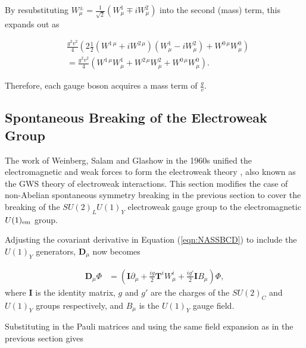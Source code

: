 \documentclass{article}
\begin{document}
By resubstituting $W^{\pm}_\mu = \frac{1}{\sqrt{2}}(W^{1}_\mu \mp iW^{2}_\mu)$ into the second (mass) term, this expands out as

\begin{equation}
\begin{split}
& \frac{g^2v^2}{4}\left( 2\frac{1}{2}(W^{1\,\mu}+iW^{2\,\mu})(W^{1}_\mu - iW^{2}_\mu) + W^{0\,\mu}W^{0}_\mu\right) \\ 
& = \frac{g^2v^2}{4}(W^{1\,\mu}W^{1}_\mu + W^{2\,\mu}W^{2}_\mu + W^{0\,\mu}W^{0}_\mu).
\end{split}
\end{equation}

Therefore, each gauge boson acquires a mass term of $\frac{g}{v}$.

\subsection{Spontaneous Breaking of the Electroweak Group}%
\label{sec:SM_EWU}
The work of Weinberg, Salam and Glashow in the 1960s unified the electromagnetic and weak forces to form the electroweak theory\cite{EWUWeinberg} \cite{EWUGlashow}, also known as the GWS theory of electroweak interactions. This section modifies the case of non-Abelian spontaneous symmetry breaking in the previous section to cover the breaking of the $SU(2)_L U(1)_Y$ electroweak gauge group to the electromagnetic $U(1)_{\rm{em}}$ group.

Adjusting the covariant derivative in Equation (\ref{eqn:NASSBCD}) to include the $U(1)_Y$ generators, $\bm{D}_\mu$ now becomes

\begin{equation}
\begin{split}
\bm{D}_\mu \Phi & = \left( \bm{I} \partial_\mu + \frac{ig}{2}\bm{T}^iW^{i}_\mu + \frac{ig'}{2}\bm{I}B_\mu  \right)\Phi,
\end{split}
\end{equation}
where $\bm{I}$ is the identity matrix, $g$ and $g'$ are the charges of the $SU(2)_C$ and $U(1)_Y$ groups respectively, and $B_\mu$ is the $U(1)_Y$ gauge field.

Substituting in the Pauli matrices and using the same field expansion as in the previous section gives 
\end{document}
